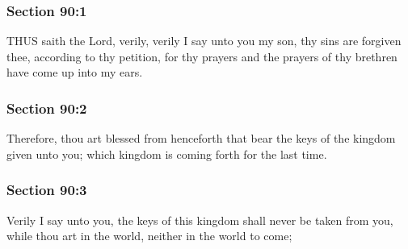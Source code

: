 	\subsubsection{Section 90:1} %
		\label{DC90-1}

		THUS saith the Lord, verily, verily I say unto you my son, thy sins are forgiven thee, according to thy petition, for thy prayers and the prayers of thy brethren have come up into my ears.


	\subsubsection{Section 90:2} %
		\label{DC90-2}

		Therefore, thou art blessed from henceforth that bear the keys of the kingdom given unto you; which kingdom is coming forth for the last time.


	\subsubsection{Section 90:3} %
		\label{DC90-3}

		Verily I say unto you, the keys of this kingdom shall never be taken from you, while thou art in the world, neither in the world to come;


